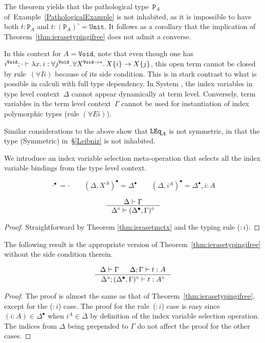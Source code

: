 \begin{example}\label{PathologicalExampleContinued}
The theorem yields that the pathological type~$\mathtt P_A$
of~Example~\ref{PathologicalExample} is not inhabited, as it is impossible
to have both $t:\mathtt P_A$ and $t:(\mathtt P_A)^\circ=\mathtt{Unit}$.
It follows as a corollary that the implication of
Theorem~\ref{thm:ierasetypingifree} does not admit a converse.

In this context for $A=\mathtt{Void}$, note that even though one has
$i^\mathtt{Void};\cdot\vdash\lambda x.\,i:\forall
j^{\mathtt{Void}}.\,\forall X^{\mathtt{Void}\to*}.\, X\{i\}\to X\{j\}$, 
this open term %
cannot be closed by rule~$(\forall Ii)$ because of its side
condition.  This is in stark contrast to what is possible in calculi with
full type dependency. In System \Fi, the index variables
in type level context~$\Delta$ cannot appear dynamically at term level.
Conversely, term variables in the term level context~$\Gamma$ cannot be
used for instantiation of index polymorphic types (rule $(\forall Ei)$).

Similar considerations to the above show that $\mathtt{LEq}_A$ is not symmetric,
in that the type {\small\rm(Symmetric)} in~\S\ref{Leibniz} is not inhabited.  
\end{example}

We introduce an index variable selection meta-operation that selects all
the index variable bindings from the type level context.

\begin{definition}
\[ \cdot^\bullet = \cdot \qquad
	(\Delta,X^A)^\bullet = \Delta^\bullet \qquad
	(\Delta,i^A)^\bullet = \Delta^\bullet,i:A
\]
\end{definition}

\begin{theorem}
\label{thm:ierasetmctxivs}
\[ \inference{\Delta |- \Gamma}{\Delta^\circ |- (\Delta^\bullet,\Gamma)^\circ}
\]
\end{theorem}
\begin{proof}
Straightforward by Theorem \ref{thm:ierasetmctx} and the typing rule ($:i$).
\end{proof}

The following result is the appropriate version of
Theorem~\ref{thm:ierasetypingifree} without the side condition therein.

\begin{theorem}
\label{thm:ierasetypingall}
\[ \inference{\Delta |- \Gamma & \Delta;\Gamma |- t : A}
		{\Delta^\circ;(\Delta^\bullet,\Gamma)^\circ |- t : A^\circ}
\]
\end{theorem}
\begin{proof}
	The proof is almost the same as that of
	Theorem~\ref{thm:ierasetypingifree}, except for the ($:i$) case.
	The proof for the rule~($:i$) case is easy
	since $(i:A) \in \Delta^\bullet$ when $i^A \in \Delta$ by definition of
	the index variable selection operation. The indices from $\Delta$
	being prepended to $\Gamma$ do not affect the proof for the other cases.
\end{proof}

